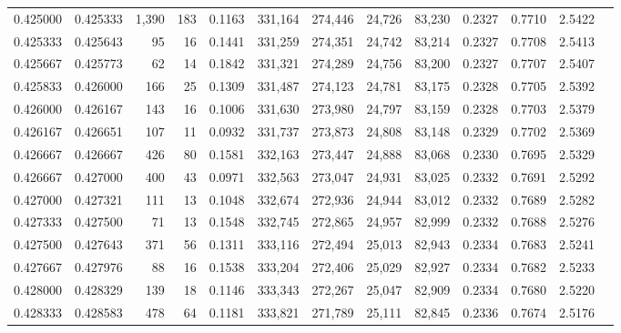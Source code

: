 \begin{tabular}{rrrrrrrrrrrrr}
0.425000 & 0.425333 & 1,390 & 183 &                                     0.1163 & 331,164 & 274,446 &  24,726 &  83,230 & 0.2327 & 0.7710 & 2.5422 \\
0.425333 & 0.425643 &    95 &  16 &                                     0.1441 & 331,259 & 274,351 &  24,742 &  83,214 & 0.2327 & 0.7708 & 2.5413 \\
0.425667 & 0.425773 &    62 &  14 &                                     0.1842 & 331,321 & 274,289 &  24,756 &  83,200 & 0.2327 & 0.7707 & 2.5407 \\
0.425833 & 0.426000 &   166 &  25 &                                     0.1309 & 331,487 & 274,123 &  24,781 &  83,175 & 0.2328 & 0.7705 & 2.5392 \\
0.426000 & 0.426167 &   143 &  16 &                                     0.1006 & 331,630 & 273,980 &  24,797 &  83,159 & 0.2328 & 0.7703 & 2.5379 \\
0.426167 & 0.426651 &   107 &  11 &                                     0.0932 & 331,737 & 273,873 &  24,808 &  83,148 & 0.2329 & 0.7702 & 2.5369 \\
0.426667 & 0.426667 &   426 &  80 &                                     0.1581 & 332,163 & 273,447 &  24,888 &  83,068 & 0.2330 & 0.7695 & 2.5329 \\
0.426667 & 0.427000 &   400 &  43 &                                     0.0971 & 332,563 & 273,047 &  24,931 &  83,025 & 0.2332 & 0.7691 & 2.5292 \\
0.427000 & 0.427321 &   111 &  13 &                                     0.1048 & 332,674 & 272,936 &  24,944 &  83,012 & 0.2332 & 0.7689 & 2.5282 \\
0.427333 & 0.427500 &    71 &  13 &                                     0.1548 & 332,745 & 272,865 &  24,957 &  82,999 & 0.2332 & 0.7688 & 2.5276 \\
0.427500 & 0.427643 &   371 &  56 &                                     0.1311 & 333,116 & 272,494 &  25,013 &  82,943 & 0.2334 & 0.7683 & 2.5241 \\
0.427667 & 0.427976 &    88 &  16 &                                     0.1538 & 333,204 & 272,406 &  25,029 &  82,927 & 0.2334 & 0.7682 & 2.5233 \\
0.428000 & 0.428329 &   139 &  18 &                                     0.1146 & 333,343 & 272,267 &  25,047 &  82,909 & 0.2334 & 0.7680 & 2.5220 \\
0.428333 & 0.428583 &   478 &  64 &                                     0.1181 & 333,821 & 271,789 &  25,111 &  82,845 & 0.2336 & 0.7674 & 2.5176 \\

\end{tabular}
